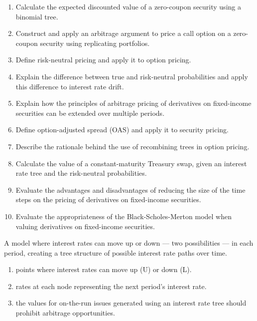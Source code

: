 
\begin{mrkeybox}[title={Learning objectives in this reading}]
\small
\begin{enumerate}[label=\textbf{\alph*.},leftmargin=1.7em]
\item Calculate the expected discounted value of a zero-coupon security using a binomial tree.
\item Construct and apply an arbitrage argument to price a call option on a zero-coupon security
      using replicating portfolios.
\item Define risk-neutral pricing and apply it to option pricing.
\item Explain the difference between true and risk-neutral probabilities and apply this
      difference to interest rate drift.
\item Explain how the principles of arbitrage pricing of derivatives on fixed-income securities
      can be extended over multiple periods.
\item Define option-adjusted spread (OAS) and apply it to security pricing.
\item Describe the rationale behind the use of recombining trees in option pricing.
\item Calculate the value of a constant-maturity Treasury swap, given an interest rate tree and
      the risk-neutral probabilities.
\item Evaluate the advantages and disadvantages of reducing the size of the time steps on the
      pricing of derivatives on fixed-income securities.
\item Evaluate the appropriateness of the Black-Scholes-Merton model when valuing derivatives on
      fixed-income securities.
\end{enumerate}
\end{mrkeybox}


\begin{mrdefbox}[title={Binomial interest rate tree}]
A model where interest rates can move up or down --- two possibilities --- in each period,
creating a tree structure of possible interest rate paths over time.
\begin{enumerate}[label=\textbf{\alph*)}]
\item {} points where interest rates can move up (U) or down (L).
\item {} rates at each node representing the next period's interest rate.
\item {} the values for on-the-run issues generated using an interest rate
      tree should prohibit arbitrage opportunities.
\end{enumerate}
\end{mrdefbox}

